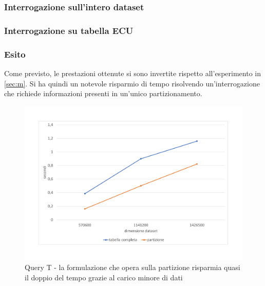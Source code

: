 \subsubsection{Interrogazione sull'intero dataset}

\subsubsection{Interrogazione su tabella ECU}

\subsubsection{Esito}
Come previsto, le prestazioni ottenute si sono invertite rispetto all'esperimento in \ref{sec:m}. Si ha quindi un notevole risparmio di tempo risolvendo un'interrogazione che richiede informazioni presenti in un'unico partizionamento. 
\begin{figure}
	\centering
	\includegraphics[width=1.0\linewidth]{figures/query_T}
	\caption{Query T - la formulazione che opera sulla partizione risparmia quasi il doppio del tempo grazie al carico minore di dati}
	\label{fig:queryt}
\end{figure}
